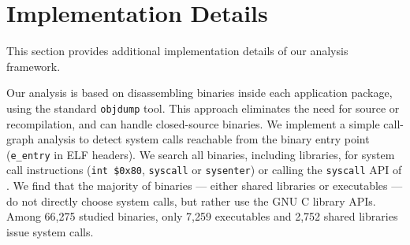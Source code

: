 \section{Implementation Details}
\label{sec:syspop:framework}

This section provides additional implementation details of our analysis framework. %


Our analysis is based on disassembling binaries inside each application package, using the standard {\tt objdump} tool.
This approach eliminates the need for source or recompilation, and can handle closed-source binaries.
We implement a simple call-graph analysis to detect system calls reachable from the binary entry point ({\tt e\_entry} in ELF headers). 
We search all binaries, including libraries, for system call instructions ({\tt int \$0x80}, {\tt syscall} or {\tt sysenter}) or calling the {\tt syscall} API of \libc{}.
We find that the majority of binaries --- either shared libraries or executables --- do not directly choose system calls, but 
rather use the GNU C library APIs.
Among 66,275 studied binaries, only 7,259 executables and 2,752 shared libraries issue system calls.





